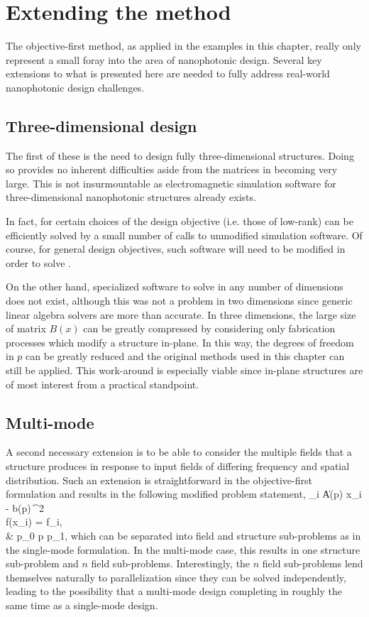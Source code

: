 
\section{Extending the method}
The objective-first method, as applied in the examples in this chapter,
    really only represent a small foray into the area of nanophotonic design.
Several key extensions to what is presented here are needed to
    fully address real-world nanophotonic design challenges.

\subsection{Three-dimensional design}
The first of these is the need to design fully three-dimensional structures.
Doing so provides no inherent difficulties aside from the matrices in
     becoming very large.
This is not insurmountable as electromagnetic simulation software for 
    three-dimensional nanophotonic structures already exists.

In fact, for certain choices of the design objective 
    (i.e. those of low-rank) 
     can be efficiently solved by a small number of calls
    to unmodified simulation software. 
Of course, for general design objectives, such software will need 
    to be modified in order to solve .

On the other hand, specialized software to solve  in 
    any number of dimensions does not exist,
    although this was not a problem in two dimensions since generic 
    linear algebra solvers are more than accurate.
In three dimensions, 
    the large size of matrix $B(x)$ can be greatly compressed by considering
    only fabrication processes which modify a structure in-plane.
In this way, the degrees of freedom in $p$ can be greatly reduced and the original
    methods used in this chapter can still be applied.
This work-around is especially viable since in-plane structures are 
    of most interest from a practical standpoint.
    
\subsection{Multi-mode}
A second necessary extension is to be able to consider the multiple fields
    that a structure produces in response to input fields of differing frequency
    and spatial distribution.
Such an extension is straightforward in the objective-first formulation
    and results in the following modified problem statement,
\BA {} \sum_i \| A(p) x_i - b(p) \|^2 \notag \\
    \subto f(x_i) = f_{i,} \quad {} \\
        & p_0 \le p \le p_1, \notag \EA
    which can be separated into field and structure sub-problems 
    as in the single-mode formulation.
In the multi-mode case, this results in one structure sub-problem 
    and $n$ field sub-problems.
Interestingly, the $n$ field sub-problems lend themselves 
    naturally to parallelization
    since they can be solved independently,
    leading to the possibility that a multi-mode design completing in
    roughly the same time as a single-mode design.

